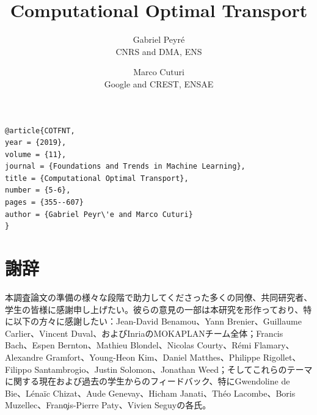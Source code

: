 \documentclass[openany]{now} %
\title{Computational Optimal Transport}
\author{%
Gabriel Peyr\'e\\CNRS and DMA, ENS
\and 
Marco Cuturi \\Google and CREST, ENSAE}}
\begin{document}
\maketitle

\begin{verbatim}@article{COTFNT,
year = {2019},
volume = {11},
journal = {Foundations and Trends in Machine Learning},
title = {Computational Optimal Transport},
number = {5-6},
pages = {355--607}
author = {Gabriel Peyr\'e and Marco Cuturi}
}\end{verbatim}

\tableofcontents

\mainmatter



%











\chapter*{謝辞}
本調査論文の準備の様々な段階で助力してくださった多くの同僚、共同研究者、学生の皆様に感謝申し上げたい。彼らの意見の一部は本研究を形作っており、特に以下の方々に感謝したい：Jean-David Benamou、Yann Brenier、Guillaume Carlier、Vincent Duval、およびInriaのMOKAPLANチーム全体；Francis Bach、Espen Bernton、Mathieu Blondel、Nicolas Courty、R\'emi Flamary、Alexandre Gramfort、Young-Heon Kim、Daniel Matthes、Philippe Rigollet、Filippo Santambrogio、Justin Solomon、Jonathan Weed；そしてこれらのテーマに関する現在および過去の学生からのフィードバック、特にGwendoline de Bie、L\'ena\"ic Chizat、Aude Genevay、Hicham Janati、Th\'eo Lacombe、Boris Muzellec、Fran\c ois-Pierre Paty、Vivien Seguyの各氏。




\end{document}
